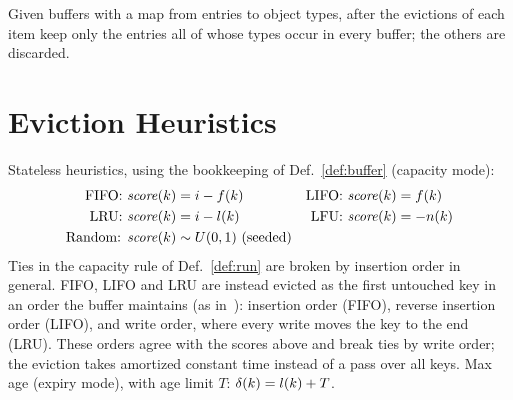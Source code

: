 \begin{definition}\label{def:coupled}
Given buffers with a map from entries to object types, after the evictions of
each item keep only the entries all of whose types occur in every buffer;
the others are discarded.
\end{definition}

\section{Eviction Heuristics}\label{sec:heuristics}

Stateless heuristics, using the bookkeeping of Def.~\ref{def:buffer}
(capacity mode):
\begin{align*}
  \text{FIFO: } & \mathit{score}(k) = i - f(k) &
  \text{LIFO: } & \mathit{score}(k) = f(k) \\
  \text{LRU: } & \mathit{score}(k) = i - l(k) &
  \text{LFU: } & \mathit{score}(k) = -n(k) \\
  \text{Random: } & \mathit{score}(k) \sim U(0,1) \text{ (seeded)}
\end{align*}
Ties in the capacity rule of Def.~\ref{def:run} are broken by insertion order
in general. FIFO, LIFO and LRU are instead evicted as the first untouched key
in an order the buffer maintains (as in~\cite{Liss2025}): insertion order
(FIFO), reverse insertion order (LIFO), and write order, where every write
moves the key to the end (LRU). These orders agree with the scores above and
break ties by write order; the eviction takes amortized constant time instead
of a pass over all keys.
Max age (expiry mode), with age limit $T$: $\delta(k) = l(k) + T$.

